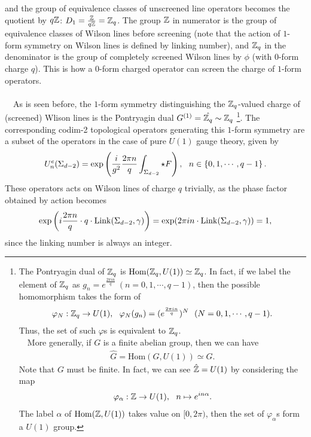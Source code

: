 \documentclass{ltjsarticle}
\theoremstyle{mystyle} %
\numberwithin{equation}{section}
\begin{document}
 and the group of equivalence classes of unscreened line operators becomes the quotient by $q\mathbb{Z}$: 
 $D_1 = \frac{\mathbb{Z}}{q\mathbb{Z}} = \mathbb{Z}_q$. 
 The group $\mathbb{Z}$ in numerator is the group of equivalence classes of Wilson lines before screening (note that the action of $1$-form symmetry on Wilson lines is defined by linking number), 
 and $\mathbb{Z}_q$ in the denominator is the group of completely screened Wilson lines by $\phi$ (with $0$-form charge $q$). 
 This is how a $0$-form charged operator can screen the charge of $1$-form operators. \\\\
 　As is seen before, the $1$-form symmetry distinguishing the $\mathbb{Z}_q$-valued charge of (screened) Wlison lines 
 is the Pontryagin dual $G^{(1)} = \hat{\mathbb{Z}_q}\sim \mathbb{Z}_q$
 \footnote{The Pontryagin dual of $\mathbb{Z}_q$ is $\mathrm{Hom}(\mathbb{Z}_q, U(1))\simeq \mathbb{Z}_q$. 
 In fact, if we label the element of $\mathbb{Z}_q$ as $g_{n} = e^{\frac{2\pi i n}{q}}~(n=0, 1, \cdots, q-1)$, 
 then the possible homomorphism takes the form of
 \begin{align}
    \varphi_N: \mathbb{Z}_q \to U(1), ~~ \varphi_{N}(g_n) = (e^{\frac{2\pi i n}{q}})^{N}~~(N=0, 1, \cdots, q-1). 
 \end{align}
 Thus, the set of such $\varphi$s is equivalent to $\mathbb{Z}_q$. \\
　More generally, if $G$ is a finite abelian group, then we can have
\begin{align}
    \hat{G} = \mathrm{Hom}(G, U(1))\simeq G. 
\end{align}
Note that $G$ must be finite. In fact, we can see $\hat{\mathbb{Z}} = U(1)$ by considering the map
\begin{align}
    \varphi_\alpha: \mathbb{Z} \to U(1), ~~ n\mapsto e^{in\alpha}. 
\end{align}
The label $\alpha$ of $\mathrm{Hom}(\mathbb{Z}, U(1))$ takes value on $[0, 2\pi)$, then 
the set of $\varphi_\alpha$s form a $U(1)$ group.}. 
 The corresponding codim-2 topological operators generating this $1$-form symmetry are 
 a subset of the operators in the case of pure $U(1)$ gauge theory, given by
 \begin{align}
    U^e_{n}(\Sigma_{d-2}) = \exp\left({
        \frac{i}{g^2}\frac{2\pi n}{q}\int_{\Sigma_{d-2}}\star F
    }\right), ~~ n\in \left\{{0, 1, \cdots, q-1}\right\}. 
 \end{align}
These operators acts on Wilson lines of charge $q$ trivially, as the phase factor obtained by action becomes
\begin{align}
    \exp\left({i\frac{2\pi n}{q}\cdot q \cdot \mathrm{Link}(\Sigma_{d-2}, \gamma)}\right) = \exp(2\pi i n \cdot \mathrm{Link}(\Sigma_{d-2}, \gamma))=1, 
\end{align}
since the linking number is always an integer. 
\end{document}

